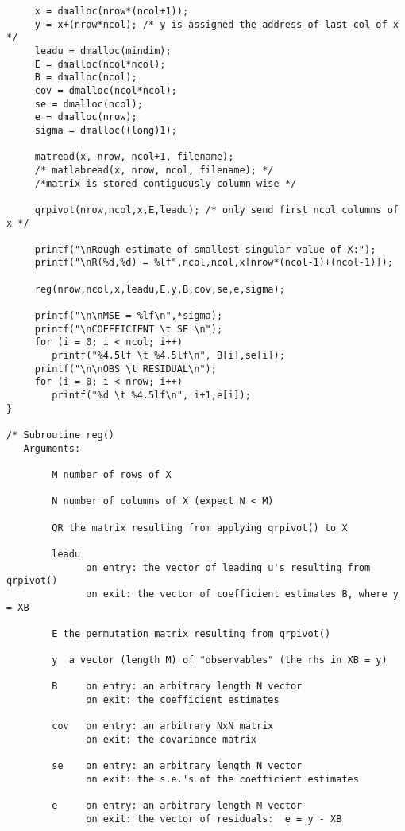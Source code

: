 \documentclass{article}
\begin{document}
\begin{verbatim}
     x = dmalloc(nrow*(ncol+1));
     y = x+(nrow*ncol); /* y is assigned the address of last col of x */
     leadu = dmalloc(mindim);
     E = dmalloc(ncol*ncol);
     B = dmalloc(ncol);
     cov = dmalloc(ncol*ncol);
     se = dmalloc(ncol);
     e = dmalloc(nrow);
     sigma = dmalloc((long)1);
  
     matread(x, nrow, ncol+1, filename); 
     /* matlabread(x, nrow, ncol, filename); */
     /*matrix is stored contiguously column-wise */

     qrpivot(nrow,ncol,x,E,leadu); /* only send first ncol columns of x */

     printf("\nRough estimate of smallest singular value of X:");
     printf("\nR(%d,%d) = %lf",ncol,ncol,x[nrow*(ncol-1)+(ncol-1)]);

     reg(nrow,ncol,x,leadu,E,y,B,cov,se,e,sigma);

     printf("\n\nMSE = %lf\n",*sigma);
     printf("\nCOEFFICIENT \t SE \n");
     for (i = 0; i < ncol; i++)
        printf("%4.5lf \t %4.5lf\n", B[i],se[i]);
     printf("\n\nOBS \t RESIDUAL\n");
     for (i = 0; i < nrow; i++)
        printf("%d \t %4.5lf\n", i+1,e[i]);
}

/* Subroutine reg()
   Arguments:
           
        M number of rows of X
 
        N number of columns of X (expect N < M)

        QR the matrix resulting from applying qrpivot() to X

        leadu
              on entry: the vector of leading u's resulting from qrpivot()
              on exit: the vector of coefficient estimates B, where y = XB

        E the permutation matrix resulting from qrpivot()

        y  a vector (length M) of "observables" (the rhs in XB = y)

        B     on entry: an arbitrary length N vector
              on exit: the coefficient estimates
                     
        cov   on entry: an arbitrary NxN matrix
              on exit: the covariance matrix

        se    on entry: an arbitrary length N vector
              on exit: the s.e.'s of the coefficient estimates

        e     on entry: an arbitrary length M vector
              on exit: the vector of residuals:  e = y - XB
           

\end{verbatim}
\end{document}
